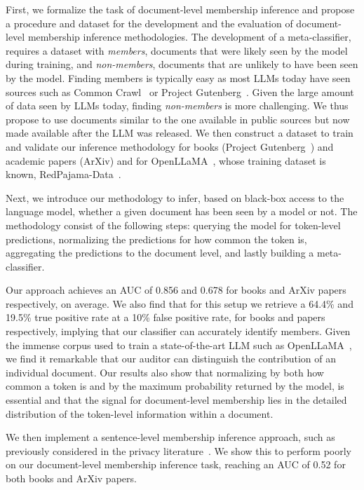 \documentclass[twocolumn,10pt]{article}
\begin{document}
First, we formalize the task of document-level membership inference and propose a procedure and dataset for the development and the evaluation of document-level membership inference methodologies. The development of a meta-classifier,  requires a dataset with \emph{members}, documents that were likely seen by the model during training, and \emph{non-members}, documents that are unlikely to have been seen by the model. Finding members is typically easy as most LLMs today have seen sources such as Common Crawl~\cite{commoncrawl} or Project Gutenberg~\cite{projectgutenberg}. Given the large amount of data seen by LLMs today, finding \emph{non-members} is more challenging. We thus propose to use documents similar to the one available in public sources but now made available after the LLM was released. We then construct a dataset to train and validate our inference methodology for books (Project Gutenberg~\cite{projectgutenberg}) and academic papers (ArXiv) and for OpenLLaMA~\cite{openlm2023openllama}, whose training dataset is known, RedPajama-Data~\cite{together2023redpajama}.

Next, we introduce our methodology to infer, based on black-box access to the language model, whether a given document has been seen by a model or not. The methodology consist of the following steps: querying the model for token-level predictions, normalizing the predictions for how common the token is, aggregating the predictions to the document level, and lastly building a meta-classifier.

Our approach achieves an AUC of 0.856 and 0.678 for books and  ArXiv papers respectively, on average. We also find that for this setup we retrieve a 64.4\% and 19.5\% true positive rate at a 10\% false positive rate, for books and papers respectively, implying that our classifier can accurately identify members. Given the immense corpus used to train a state-of-the-art LLM such as OpenLLaMA~\cite{openlm2023openllama}, we find it remarkable that our auditor can distinguish the contribution of an individual document. Our results also show that normalizing by both how common a token is and by the maximum probability returned by the model, is essential and that the signal for document-level membership lies in the detailed distribution of the token-level information within a document.

We then implement a sentence-level membership inference approach, such as previously considered in the privacy literature~\cite{yeom2018privacy,mattern2023membership,carlini2021extracting}. We show this to perform poorly on our document-level membership inference task, reaching an AUC of 0.52 for both books and ArXiv papers.
\end{document}
